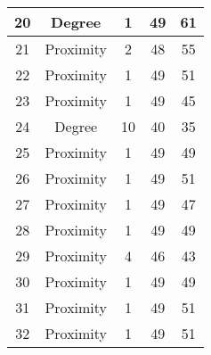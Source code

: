 \documentclass[results.tex]{subfiles}
\begin{document}
\begin{center}
\begin{tabular}{| c || c | c | c | c |}
            \hline
            20                      & Degree                       & 1                      & 49                      & 61                   \\
            \hline
            21                      & Proximity                    & 2                      & 48                      & 55                   \\
            \hline
            22                      & Proximity                    & 1                      & 49                      & 51                   \\
            \hline
            23                      & Proximity                    & 1                      & 49                      & 45                   \\
            \hline
            24                      & Degree                       & 10                     & 40                      & 35                   \\
            \hline
            25                      & Proximity                    & 1                      & 49                      & 49                   \\
            \hline
            26                      & Proximity                    & 1                      & 49                      & 51                   \\
            \hline
            27                      & Proximity                    & 1                      & 49                      & 47                   \\
            \hline
            28                      & Proximity                    & 1                      & 49                      & 49                   \\
            \hline
            29                      & Proximity                    & 4                      & 46                      & 43                   \\
            \hline
            30                      & Proximity                    & 1                      & 49                      & 49                   \\
            \hline
            31                      & Proximity                    & 1                      & 49                      & 51                   \\
            \hline
            32                      & Proximity                    & 1                      & 49                      & 51                   \\

\end{tabular}
\end{center}
\end{document}
